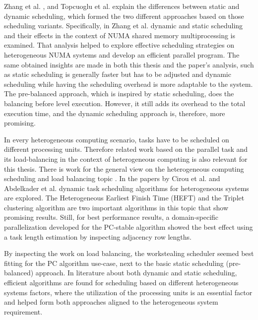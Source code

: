 Zhang et al. \cite{zhangDynamicStaticLoad1991}, and Topcuoglu et al. \cite{topcuogluPerformanceeffectiveLowcomplexityTask2002} explain the differences between static and dynamic scheduling, which formed the two different approaches based on those scheduling variants. Specifically, in Zhang et al. \cite{zhangDynamicStaticLoad1991} dynamic and static scheduling and their effects in the context of NUMA shared memory multiprocessing is examined. That analysis helped to explore effective scheduling strategies on heterogeneous NUMA systems and develop an efficient parallel program. The same obtained insights are made in both this thesis and the paper's analysis, such as static scheduling is generally faster but has to be adjusted and dynamic scheduling while having the scheduling overhead is more adaptable to the system.
The pre-balanced approach, which is inspired by static scheduling, does the balancing before level execution. However, it still adds its overhead to the total execution time, and the dynamic scheduling approach is, therefore, more promising.

In every heterogeneous computing scenario, tasks have to be scheduled on different processing units. Therefore related work based on the parallel task and its load-balancing in the context of heterogeneous computing is also relevant for this thesis. There is work for the general view on the heterogeneous computing scheduling and load balancing topic \cite{cirouTripletClusteringScheduling2001, abdelkaderDynamicTaskScheduling2012,binottoDynamicReconfigurableLoadbalancing2010,galindoDynamicLoadBalancing2008,kopetzRealTimeScheduling1997,kwokStaticSchedulingAlgorithms1999,momcilovicDynamicLoadBalancing2014,singhSurveyStaticScheduling2015}. In the papers by Cirou et al. \cite{cirouTripletClusteringScheduling2001} and Abdelkader et al. \cite{abdelkaderDynamicTaskScheduling2012} dynamic task scheduling algorithms for heterogeneous systems are explored. The Heterogeneous Earliest Finish Time (HEFT) and the Triplet clustering algorithm are two important algorithms in this topic that show promising results. Still, for best performance results, a domain-specific parallelization developed for the PC-stable algorithm showed the best effect using a task length estimation by inspecting adjacency row lengths.

By inspecting the work on load balancing, the workstealing scheduler seemed best fitting for the PC algorithm use-case, next to the basic static scheduling (pre-balanced) approach. In literature about both dynamic and static scheduling, efficient algorithms are found for scheduling based on different heterogeneous systems factors, where the utilization of the processing units is an essential factor and helped form both approaches aligned to the heterogeneous system requirement. 

